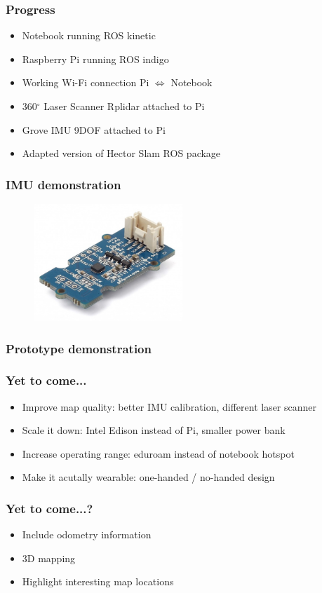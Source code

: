 \documentclass{beamer}
\begin{document}
\begin{frame}
\frametitle{Progress}
\begin{itemize}
\item Notebook running ROS kinetic 
\pause
\item Raspberry Pi running ROS indigo 
\pause
\item Working Wi-Fi connection Pi $\Leftrightarrow$ Notebook 
\pause
\item 360$^{\circ}$ Laser Scanner Rplidar attached to Pi
\pause
\item Grove IMU 9DOF attached to Pi
\pause
\item Adapted version of Hector Slam ROS package
\end{itemize}
\end{frame}


\begin{frame}
\frametitle{IMU demonstration}
\begin{figure}
\begin{center}
\includegraphics[width=0.5\textwidth]{IMU.JPG}
\end{center}
\end{figure}
\end{frame}


\begin{frame}
\frametitle{Prototype demonstration}
\end{frame}


\begin{frame}
\frametitle{Yet to come...}
\begin{itemize}
\item Improve map quality: better IMU calibration, different laser scanner
\item Scale it down: Intel Edison instead of Pi, smaller power bank
\item Increase operating range: eduroam instead of notebook hotspot
\item Make it acutally wearable: one-handed / no-handed design
\end{itemize}
\end{frame}


\begin{frame}
\frametitle{Yet to come...?}
\begin{itemize}
\item Include odometry information
\item 3D mapping
\item Highlight interesting map locations
\end{itemize}
\end{frame}
\end{document}
